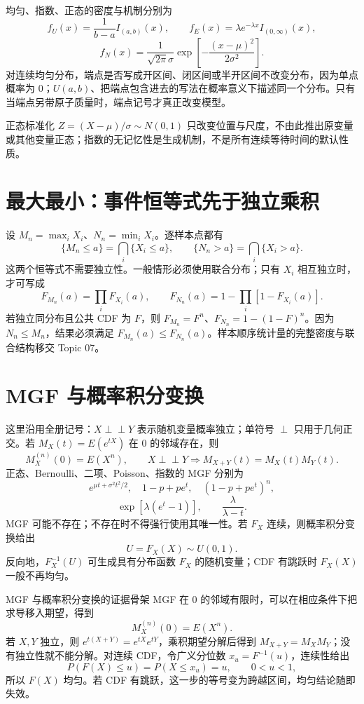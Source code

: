 \documentclass[11pt,a4paper]{ctexart}
\newcommand{\indep}{\mathrel{\perp\!\!\!\perp}}
\begin{document}
均匀、指数、正态的密度与机制分别为
\[
f_U(x)=\frac1{b-a}I_{(a,b)}(x),\qquad
f_E(x)=\lambda e^{-\lambda x}I_{(0,\infty)}(x),
\]
\[
f_N(x)=\frac1{\sqrt{2\pi}\sigma}\exp\left[-\frac{(x-\mu)^2}{2\sigma^2}\right].
\]
对连续均匀分布，端点是否写成开区间、闭区间或半开区间不改变分布，因为单点概率为 $0$；$U(a,b)$、把端点包含进去的写法在概率意义下描述同一个分布。只有当端点另带原子质量时，端点记号才真正改变模型。

正态标准化 $Z=(X-\mu)/\sigma\sim N(0,1)$ 只改变位置与尺度，不由此推出原变量或其他变量正态；指数的无记忆性是生成机制，不是所有连续等待时间的默认性质。

\section{最大最小：事件恒等式先于独立乘积}

设 $M_n=\max_iX_i$、$N_n=\min_iX_i$。逐样本点都有
\[
\{M_n\le a\}=\bigcap_i\{X_i\le a\},\qquad
\{N_n>a\}=\bigcap_i\{X_i>a\}.
\]
这两个恒等式不需要独立性。一般情形必须使用联合分布；只有 $X_i$ 相互独立时，才可写成
\[
F_{M_n}(a)=\prod_iF_{X_i}(a),\qquad
F_{N_n}(a)=1-\prod_i[1-F_{X_i}(a)].
\]
若独立同分布且公共 CDF 为 $F$，则 $F_{M_n}=F^n$、$F_{N_n}=1-(1-F)^n$。因为 $N_n\le M_n$，结果必须满足 $F_{M_n}(a)\le F_{N_n}(a)$。样本顺序统计量的完整密度与联合结构移交 Topic 07。

\section{MGF 与概率积分变换}

这里沿用全册记号：$X\indep Y$ 表示随机变量概率独立；单符号 $\perp$ 只用于几何正交。若 $M_X(t)=E(e^{tX})$ 在 $0$ 的邻域存在，则
\[
M_X^{(n)}(0)=E(X^n),\qquad X\indep Y\Longrightarrow M_{X+Y}(t)=M_X(t)M_Y(t).
\]
正态、Bernoulli、二项、Poisson、指数的 MGF 分别为
\[
e^{\mu t+\sigma^2t^2/2},\quad 1-p+pe^t,\quad (1-p+pe^t)^n,
\]
\[
\exp[\lambda(e^t-1)],\qquad \frac{\lambda}{\lambda-t}.
\]
MGF 可能不存在；不存在时不得强行使用其唯一性。若 $F_X$ 连续，则概率积分变换给出
\[
\boxed{U=F_X(X)\sim U(0,1)}.
\]
反向地，$F_X^{-1}(U)$ 可生成具有分布函数 $F_X$ 的随机变量；CDF 有跳跃时 $F_X(X)$ 一般不再均匀。

\begin{methodbox}{MGF 与概率积分变换的证据骨架}
MGF 在 $0$ 的邻域有限时，可以在相应条件下把求导移入期望，得到
\[
M_X^{(n)}(0)=E(X^n).
\]
若 $X,Y$ 独立，则 $e^{t(X+Y)}=e^{tX}e^{tY}$，乘积期望分解后得到 $M_{X+Y}=M_XM_Y$；没有独立性就不能分解。对连续 CDF，令广义分位数 $x_u=F^{-1}(u)$，连续性给出
\[
P(F(X)\le u)=P(X\le x_u)=u,\qquad0<u<1,
\]
所以 $F(X)$ 均匀。若 CDF 有跳跃，这一步的等号变为跨越区间，均匀结论随即失效。
\end{methodbox}
\end{document}
